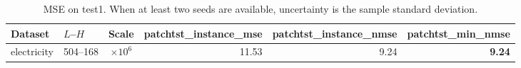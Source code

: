 \begin{table}[htbp]
\centering
\caption{MSE on test1. When at least two seeds are available, uncertainty is the sample standard deviation.}
\begin{tabular}{llcrrr}
\toprule
Dataset & $L$--$H$ & Scale & patchtst\_instance\_mse & patchtst\_instance\_nmse & patchtst\_min\_nmse \\
\midrule
electricity & 504--168 & $\times 10^{6}$ & 11.53 & 9.24 & \textbf{9.24} \\
\bottomrule
\end{tabular}
\end{table}
